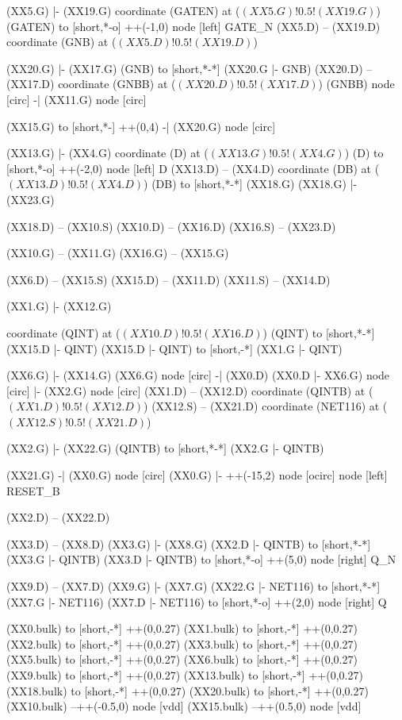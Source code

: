 \begin{circuitikz}[american]

	(XX5.G) |- (XX19.G)
	coordinate (GATEN) at ($(XX5.G)!0.5!(XX19.G)$)
	(GATEN) to [short,*-o] ++(-1,0) node [left] {GATE\_N}
	(XX5.D) -- (XX19.D)
	coordinate (GNB) at ($(XX5.D)!0.5!(XX19.D)$)
	
	(XX20.G) |- (XX17.G)
	(GNB) to [short,*-*] (XX20.G |- GNB)
	(XX20.D) -- (XX17.D)
	coordinate (GNBB) at ($(XX20.D)!0.5!(XX17.D)$)
	(GNBB) node [circ] {} -| (XX11.G) node [circ] {}
	
	(XX15.G) to [short,*-] ++(0,4) -| (XX20.G) node [circ] {}
	
	(XX13.G) |- (XX4.G)
	coordinate (D) at ($(XX13.G)!0.5!(XX4.G)$)
	(D) to [short,*-o] ++(-2,0) node [left] {D}
	(XX13.D) -- (XX4.D) 
	coordinate (DB) at ($(XX13.D)!0.5!(XX4.D)$)
	(DB) to [short,*-*] (XX18.G)
	(XX18.G) |- (XX23.G)
	
	(XX18.D) -- (XX10.S) 
	(XX10.D) -- (XX16.D)
	(XX16.S) -- (XX23.D)
	
	(XX10.G) -- (XX11.G)
	(XX16.G) -- (XX15.G)
	
	(XX6.D) -- (XX15.S)
	(XX15.D) -- (XX11.D)
	(XX11.S) -- (XX14.D)
	
	(XX1.G) |- (XX12.G)	
	
	coordinate (QINT) at ($(XX10.D)!0.5!(XX16.D)$)
	(QINT) to [short,*-*] (XX15.D |- QINT)
	(XX15.D |- QINT) to [short,-*] (XX1.G |- QINT)	
	
	(XX6.G) |- (XX14.G)
	(XX6.G) node [circ] {} -| (XX0.D)
	(XX0.D |- XX6.G) node [circ] {} |- (XX2.G) node [circ] {} 
	(XX1.D) -- (XX12.D)
	coordinate (QINTB) at ($(XX1.D)!0.5!(XX12.D)$)
	(XX12.S) -- (XX21.D)
	coordinate (NET116) at ($(XX12.S)!0.5!(XX21.D)$)
	
	(XX2.G) |- (XX22.G)
	(QINTB) to [short,*-*] (XX2.G |- QINTB) 
	
	(XX21.G) -| (XX0.G) node [circ] {}
	(XX0.G) |- ++(-15,2) node [ocirc] {} node [left] {RESET\_B}
	
	(XX2.D) -- (XX22.D)
	
	(XX3.D) -- (XX8.D)
	(XX3.G) |- (XX8.G)
	(XX2.D |- QINTB) to [short,*-*] (XX3.G |- QINTB)
	(XX3.D |- QINTB) to [short,*-o] ++(5,0) node [right] {Q\_N}
	
	(XX9.D) -- (XX7.D)
	(XX9.G) |- (XX7.G)
	(XX22.G |- NET116) to [short,*-*] (XX7.G |- NET116)
	(XX7.D |- NET116) to [short,*-o] ++(2,0) node [right] {Q} 
	
	(XX0.bulk) to [short,-*] ++(0,0.27)
	(XX1.bulk) to [short,-*] ++(0,0.27)
	(XX2.bulk) to [short,-*] ++(0,0.27)
	(XX3.bulk) to [short,-*] ++(0,0.27)
	(XX5.bulk) to [short,-*] ++(0,0.27)
	(XX6.bulk) to [short,-*] ++(0,0.27)
	(XX9.bulk) to [short,-*] ++(0,0.27)
	(XX13.bulk) to [short,-*] ++(0,0.27)
	(XX18.bulk) to [short,-*] ++(0,0.27)	
	(XX20.bulk) to [short,-*] ++(0,0.27)	
	(XX10.bulk) --++(-0.5,0) node [vdd] {}
	(XX15.bulk) --++(0.5,0) node [vdd] {}
	

\end{circuitikz}
